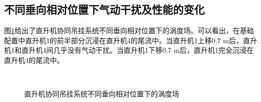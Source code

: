 \subsection{不同垂向相对位置下气动干扰及性能的变化}
图\ref{fig:chap3_5_4_1}给出了直升机协同吊挂系统不同垂向相对位置下的涡度场。可以看出，在基础配置中直升机1的前半部分沉浸在直升机4的尾流中。当直升机1上移0.7 m后，直升机1和直升机4间几乎没有气动干扰。当直升机1下移0.7 m后，直升机1完全沉浸在直升机4的尾流中。
\begin{figure}[!htb]
  \centering
  \\ 
  \quad
  \caption{直升机协同吊挂系统不同垂向相对位置下的涡度场}
  \label{fig:chap3_5_4_1}
\end{figure}

